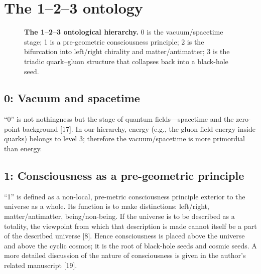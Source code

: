 \documentclass[11pt,a4paper]{article}
\begin{document}
\section{The 1--2--3 ontology}

\begin{figure}[htbp]
\centering
{}
\caption{\textbf{The 1--2--3 ontological hierarchy.} 0 is the vacuum/spacetime stage; 1 is a pre-geometric consciousness principle; 2 is the bifurcation into left/right chirality and matter/antimatter; 3 is the triadic quark--gluon structure that collapses back into a black-hole seed.}
\label{fig:ontology}
\end{figure}

\subsection{0: Vacuum and spacetime}
``0'' is not nothingness but the stage of quantum fields---spacetime and the zero-point background [17]. In our hierarchy, energy (e.g., the gluon field energy inside quarks) belongs to level 3; therefore the vacuum/spacetime is more primordial than energy.

\subsection{1: Consciousness as a pre-geometric principle}
``1'' is defined as a non-local, pre-metric consciousness principle exterior to the universe as a whole. Its function is to make distinctions: left/right, matter/antimatter, being/non-being. If the universe is to be described as a totality, the viewpoint from which that description is made cannot itself be a part of the described universe [8]. Hence consciousness is placed above the universe and above the cyclic cosmos; it is the root of black-hole seeds and cosmic seeds. A more detailed discussion of the nature of consciousness is given in the author's related manuscript [19].
\end{document}
